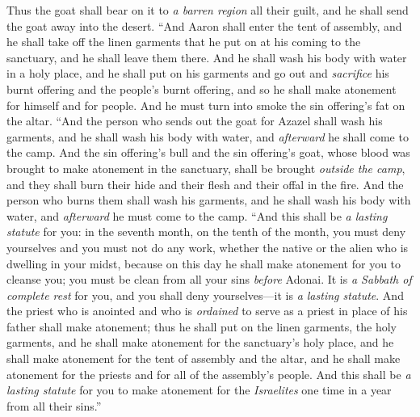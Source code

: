 \begin{biblechapter}
\verse Thus the goat shall bear on it to \textit{a barren region} all their guilt, and he shall send the goat away into the desert.
\verse “And Aaron shall enter the tent of assembly, and he shall take off the linen garments that he put on at his coming to the sanctuary, and he shall leave them there.
\verse And he shall wash his body with water in a holy place, and he shall put on his garments and go out and \textit{sacrifice} his burnt offering and the people’s burnt offering, and so he shall make atonement for himself and for people.
\verse And he must turn into smoke the sin offering’s fat on the altar.
\verse “And the person who sends out the goat for Azazel shall wash his garments, and he shall wash his body with water, and \textit{afterward} he shall come to the camp.
\verse And the sin offering’s bull and the sin offering’s goat, whose blood was brought to make atonement in the sanctuary, shall be brought \textit{outside the camp}, and they shall burn their hide and their flesh and their offal in the fire.
\verse And the person who burns them shall wash his garments, and he shall wash his body with water, and \textit{afterward} he must come to the camp.
\verse “And this shall be \textit{a lasting statute} for you: in the seventh month, on the tenth of the month, you must deny yourselves and you must not do any work, whether the native or the alien who is dwelling in your midst,
\verse because on this day he shall make atonement for you to cleanse you; you must be clean from all your sins \textit{before} Adonai.
\verse It is \textit{a Sabbath of complete rest} for you, and you shall deny yourselves—it is \textit{a lasting statute}.
\verse And the priest who is anointed and who is \textit{ordained} to serve as a priest in place of his father shall make atonement; thus he shall put on the linen garments, the holy garments,
\verse and he shall make atonement for the sanctuary’s holy place, and he shall make atonement for the tent of assembly and the altar, and he shall make atonement for the priests and for all of the assembly’s people.
\verse And this shall be \textit{a lasting statute} for you to make atonement for the \textit{Israelites} one time in a year from all their sins.”
\end{biblechapter}

